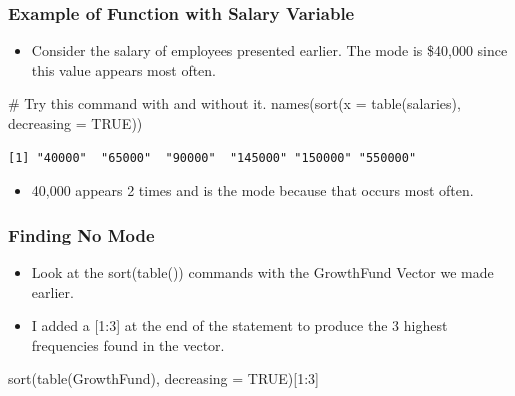 \documentclass[
  letterpaper,
  DIV=11,
  numbers=noendperiod]{scrreprt}
\newenvironment{Shaded}{\begin{snugshade}}{\end{snugshade}}
\newcommand{\AttributeTok}[1]{\textcolor[rgb]{0.40,0.45,0.13}{#1}}
\newcommand{\CommentTok}[1]{\textcolor[rgb]{0.37,0.37,0.37}{#1}}
\newcommand{\ConstantTok}[1]{\textcolor[rgb]{0.56,0.35,0.01}{#1}}
\newcommand{\DecValTok}[1]{\textcolor[rgb]{0.68,0.00,0.00}{#1}}
\newcommand{\FunctionTok}[1]{\textcolor[rgb]{0.28,0.35,0.67}{#1}}
\newcommand{\NormalTok}[1]{\textcolor[rgb]{0.00,0.23,0.31}{#1}}
\newcommand{\SpecialCharTok}[1]{\textcolor[rgb]{0.37,0.37,0.37}{#1}}
\providecommand{\tightlist}{%
  \setlength{\itemsep}{0pt}\setlength{\parskip}{0pt}}\usepackage{longtable,booktabs,array}
\begin{document}
\subsubsection{Example of Function with Salary
Variable}\label{example-of-function-with-salary-variable}

\begin{itemize}
\tightlist
\item
  Consider the salary of employees presented earlier. The mode is
  \$40,000 since this value appears most often.
\end{itemize}

\begin{Shaded}
\begin{Highlighting}[]
\CommentTok{\# Try this command with and without it.}
\FunctionTok{names}\NormalTok{(}\FunctionTok{sort}\NormalTok{(}\AttributeTok{x =} \FunctionTok{table}\NormalTok{(salaries), }\AttributeTok{decreasing =} \ConstantTok{TRUE}\NormalTok{))}
\end{Highlighting}
\end{Shaded}

\begin{verbatim}
[1] "40000"  "65000"  "90000"  "145000" "150000" "550000"
\end{verbatim}

\begin{itemize}
\tightlist
\item
  40,000 appears 2 times and is the mode because that occurs most often.
\end{itemize}

\subsubsection{Finding No Mode}\label{finding-no-mode}

\begin{itemize}
\tightlist
\item
  Look at the sort(table()) commands with the GrowthFund Vector we made
  earlier.
\item
  I added a {[}1:3{]} at the end of the statement to produce the 3
  highest frequencies found in the vector.
\end{itemize}

\begin{Shaded}
\begin{Highlighting}[]
\FunctionTok{sort}\NormalTok{(}\FunctionTok{table}\NormalTok{(GrowthFund), }\AttributeTok{decreasing =} \ConstantTok{TRUE}\NormalTok{)[}\DecValTok{1}\SpecialCharTok{:}\DecValTok{3}\NormalTok{]}
\end{Highlighting}
\end{Shaded}
\end{document}
